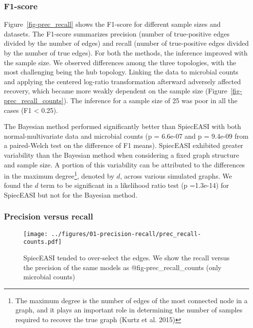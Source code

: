 \documentclass[
  a4paper,
]{article}
\begin{document}
\hypertarget{f1-score}{%
\subsubsection{F1-score}\label{f1-score}}

Figure~\ref{fig-prec_recall} shows the F1-score for different sample
sizes and datasets. The F1-score summarizes precision (number of
true-positive edges divided by the number of edges) and recall (number
of true-positive edges divided by the number of true edges). For both
the methods, the inference improved with the sample size. We observed
differences among the three topologies, with the most challenging being
the hub topology. Linking the data to microbial counts and applying the
centered log-ratio transformation afterward adversely affected recovery,
which became more weakly dependent on the sample size
(Figure~\ref{fig-prec_recall_counts}). The inference for a sample size
of 25 was poor in all the cases (F1 \textless{} 0.25).

The Bayesian method performed significantly better than SpiecEASI with
both normal-multivariate data and microbial counts (p = 6.6e-07 and p =
9.4e-09 from a paired-Welch test on the difference of F1 means).
SpiecEASI exhibited greater variability than the Bayesian method when
considering a fixed graph structure and sample size. A portion of this
variability can be attributed to the differences in the maximum
degree\footnote{The maximum degree is the number of edges of the most
  connected node in a graph, and it plays an important role in
  determining the number of samples required to recover the true graph
  (Kurtz et al. 2015)}, denoted by \(d\), across various simulated
graphs. We found the \(d\) term to be significant in a likelihood ratio
test (p =1.3e-14) for SpiecEASI but not for the Bayesian method.

\hypertarget{precision-versus-recall}{%
\subsubsection{Precision versus recall}\label{precision-versus-recall}}

\begin{figure}

{\centering \texttt{[image: ../figures/01-precision-recall/prec\_recall-counts.pdf]}

}

\caption{\label{fig-precision_recall_counts}SpiecEASI tended to
over-select the edges. We show the recall versus the precision of the
same models as @fig-prec\_recall\_counts (only microbial counts)}

\end{figure}
\end{document}
